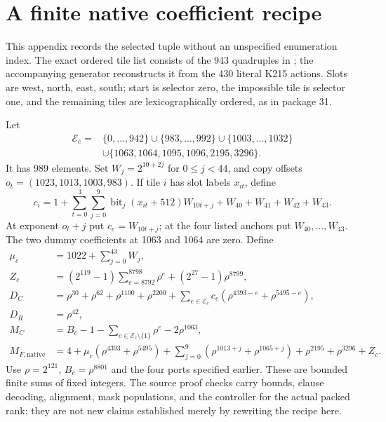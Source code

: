 \documentclass[11pt,a4paper]{article}
\theoremstyle{definition}
\theoremstyle{remark}
\numberwithin{equation}{section}
\begin{document}
\clearpage
\appendix
\section{A finite native coefficient recipe}
\label{app:coefficients}

This appendix records the selected tuple without an unspecified
enumeration index. The exact ordered tile list consists of the 943
quadruples in ;
the accompanying generator reconstructs it from the 430 literal K215
actions. Slots are west, north, east, south; start is selector zero,
the impossible tile is selector one, and the remaining tiles are
lexicographically ordered, as in package 31.

Let
\begin{align*}
 \mathcal E_c={}&\{0,\ldots,942\}\cup\{983,\ldots,992\}
 \cup\{1003,\ldots,1032\}\\
 &\cup\{1063,1064,1095,1096,2195,3296\}.
\end{align*}
It has 989 elements. Set $W_j=2^{10+2j}$ for $0\le j<44$,
and copy offsets $o_t=(1023,1013,1003,983)$. If tile $i$ has
slot labels $x_{it}$, define
\[
 c_i=1+\sum_{t=0}^3\sum_{j=0}^9
        \operatorname{bit}_j(x_{it}+512)W_{10t+j}
        +W_{40}+W_{41}+W_{42}+W_{43}.
\]
At exponent $o_t+j$ put $c_e=W_{10t+j}$; at the four listed
anchors put $W_{40},\ldots,W_{43}$. The two dummy coefficients
at 1063 and 1064 are zero. Define
\begin{align*}
 \mu_c&=1022+\sum_{j=0}^{43}W_j,\\
 Z_c&=(2^{119}-1)\sum_{e=8792}^{8798}\rho^e
                 +(2^{27}-1)\rho^{8799},\\
 D_C&=\rho^{30}+\rho^{62}+\rho^{1100}+\rho^{2200}
       +\sum_{e\in\mathcal E_c}c_e(\rho^{4393-e}+\rho^{5495-e}),\\
 D_R&=\rho^{42},\\
 M_C&=B_c-1-\sum_{e\in\mathcal E_c\setminus\{1\}}\rho^e
                       -2\rho^{1063},\\
 M_{F,\mathrm{native}}&=4+\mu_c(\rho^{4393}+\rho^{5495})
       +\sum_{j=0}^9(\rho^{1013+j}+\rho^{1065+j})
       +\rho^{2195}+\rho^{3296}+Z_c.
\end{align*}
Use $\rho=2^{121}$, $B_c=\rho^{8801}$ and the four ports
specified earlier. These are bounded finite sums of fixed integers.
The source proof checks carry bounds, clause decoding, alignment,
mask populations, and the controller for the actual packed rank;
they are not new claims established merely by rewriting the recipe here.
\end{document}
